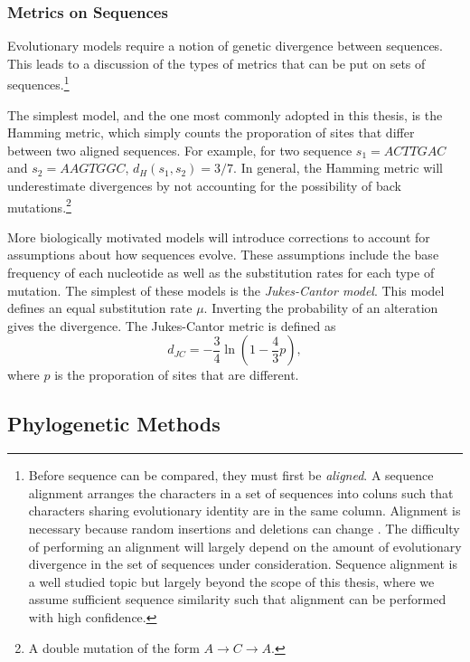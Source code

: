 \subsubsection{Metrics on Sequences}
\label{bg:subsubsec:metrics}

Evolutionary models require a notion of genetic divergence between sequences.
This leads to a discussion of the types of metrics that can be put on sets of sequences.\footnote{Before sequence can be compared, they must first be \emph{aligned}. A sequence alignment arranges the characters in a set of sequences into coluns such that characters sharing evolutionary identity are in the same column. Alignment is necessary because random insertions and deletions can change . The difficulty of performing an alignment will largely depend on the amount of evolutionary divergence in the set of sequences under consideration. Sequence alignment is a well studied topic but largely beyond the scope of this thesis, where we assume sufficient sequence similarity such that alignment can be performed with high confidence.}

The simplest model, and the one most commonly adopted in this thesis, is the Hamming metric, which simply counts the proporation of sites that differ between two aligned sequences.
For example, for two sequence $s_1=ACTTGAC$ and $s_2=AAGTGGC$, $d_{H}(s_1,s_2)=3/7$.
In general, the Hamming metric will underestimate divergences by not accounting for the possibility of back mutations.\footnote{A double mutation of the form $A\rightarrow C\rightarrow A$.}

More biologically motivated models will introduce corrections to account for assumptions about how sequences evolve.
These assumptions include the base frequency of each nucleotide as well as the substitution rates for each type of mutation.
The simplest of these models is the \emph{Jukes-Cantor model}.
This model defines an equal substitution rate $\mu$.
Inverting the probability of an alteration gives the divergence.
The Jukes-Cantor metric is defined as 
\begin{equation}
d_{JC}=-\frac{3}{4}\ln(1-\frac{4}{3}p),
\end{equation}
where $p$ is the proporation of sites that are different.

\subsection{Phylogenetic Methods}

